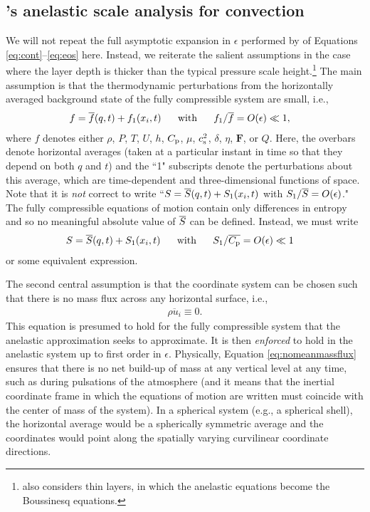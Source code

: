 \documentclass[12pt]{article}
\newcommand{\vecf}{\bm{F}}
\begin{document}
	\subsection{\citet{Gough1969}'s anelastic scale analysis for convection}
	We will not repeat the full asymptotic expansion in $\epsilon$ performed by \citet{Gough1969} of Equations \eqref{eq:cont}--\eqref{eq:eos} here. Instead, we reiterate the salient assumptions in the case where the layer depth is thicker than the typical pressure scale height.\footnote{\citet{Gough1969} also considers thin layers, in which the anelastic equations become the Boussinesq equations.} The main assumption is that the thermodynamic perturbations from the horizontally averaged background state of the fully compressible system are small, i.e.,
	\begin{align}\label{eq:smallthermalpert}
		f = \overline{f}(q,t) + f_1(x_i,t)\ \ \ \ \  &\text{with}\ \ \ \ \  f_1/\overline{f}=O(\epsilon)\ll 1,
	\end{align} 
	where $f$ denotes either $\rho$, $P$, $T$, $U$, $h$, $C_{\rm{p}}$, $\mu$, $c_{\rm s}^2$, $\delta$, $\eta$, $\vecf$, or $Q$. Here, the overbars denote horizontal averages (taken at a particular instant in time so that they depend on both $q$ and $t$) and the ``1" subscripts denote the perturbations about this average, which are time-dependent and three-dimensional functions of space. Note that it is \textit{not} correct to write ``$S=\overline{S}(q,t)+S_1(x_i,t)$ with $S_1/\overline{S}=O(\epsilon)$." The fully compressible equations of motion contain only differences in entropy and so no meaningful absolute value of $\overline{S}$ can be defined. Instead, we must write
	\begin{align}\label{eq:linearent}
	S = \overline{S}(q,t) + S_1(x_i,t) \ \ \ \ \  &\text{with}\ \ \ \ \  S_1/\overline{C_{\rm{p}}}=O(\epsilon)\ll 1
	\end{align}
	or some equivalent expression.
	
	The second central assumption is that the coordinate system can be chosen such that there is no mass flux across any horizontal surface, i.e.,
	\begin{align}\label{eq:nomeanmassflux}
		\overline{\rho u_i}\equiv0.
	\end{align}
	This equation is presumed to hold for the fully compressible system that the anelastic approximation seeks to approximate. It is then \textit{enforced} to hold in the anelastic system up to first order in $\epsilon$. Physically, Equation \eqref{eq:nomeanmassflux} ensures that there is no net build-up of mass at any vertical level at any time, such as during pulsations of the atmosphere (and it means that the inertial coordinate frame in which the equations of motion are written must coincide with the center of mass of the system). In a spherical system (e.g., a spherical shell), the horizontal average would be a spherically symmetric average and the coordinates would point along the spatially varying curvilinear coordinate directions.
	
\end{document}

